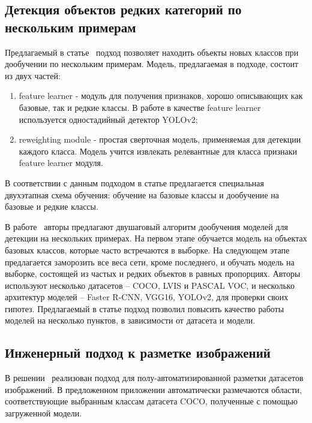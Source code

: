 \documentclass[a4paper,14pt]{article}
\begin{document}
    \subsection{Детекция объектов редких категорий по нескольким примерам}

    Предлагаемый в статье~\cite{FSODFeatureReweighting} подход позволяет находить объекты новых классов при дообучении по нескольким примерам.
    Модель, предлагаемая в подходе, состоит из двух частей:
    \begin{enumerate}
        [1)]
        \itemsep0em
        \item feature learner - модуль для получения признаков, хорошо описывающих как базовые, так и редкие классы.
        В работе в качестве feature learner используется одностадийный детектор YOLOv2;
        \item reweighting module - простая сверточная модель, применяемая для детекции каждого класса. Модель учится извлекать релевантные для класса признаки feature learner модуля.
    \end{enumerate}
    В соответствии с данным подходом в статье предлагается специальная двухэтапная схема обучения: обучение на базовые классы и дообучение на базовые и редкие классы.

    В работе~\cite{wang2020few} авторы предлагают двушаговый алгоритм дообучения моделей для детекции на нескольких примерах.
    На первом этапе обучается модель на объектах базовых классов, которые часто встречаются в выборке.
    На следующем этапе предлагается заморозить все веса сети, кроме последнего, и обучать модель на выборке, состоящей из частых и редких объектов в равных пропорциях.
    Авторы используют несколько датасетов -- COCO, LVIS и PASCAL VOC,
    и несколько архитектур моделей -- Faster R-CNN, VGG16, YOLOv2, для проверки своих гипотез.
    Предлагаемый в статье подход позволил повысить качество работы моделей на несколько пунктов, в зависимости от датасета и модели.


    \subsection{Инженерный подход к разметке изображений}

    В решении~\cite{AnnoMage} реализован подход для полу-автоматизированной разметки датасетов изображений.
    В предложенном приложении автоматически размечаются области, соответствующие выбранным классам датасета COCO, полученные с помощью загруженной модели.
\end{document}
